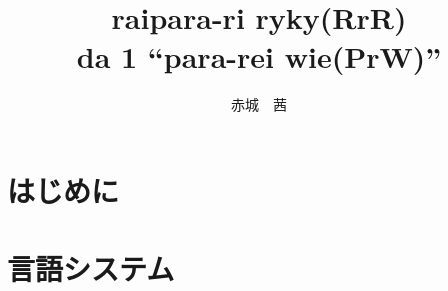 \documentclass[a4paper, 12pt, titlepage]{ltjsarticle}
\title{raipara-ri ryky(RrR) \\ \small da 1 ``para-rei wie(PrW)''}
\author{赤城　茜}
\begin{document}
\maketitle

\tableofcontents
\clearpage

\part{はじめに}


\clearpage

\part{言語システム}



\clearpage
\end{document}
